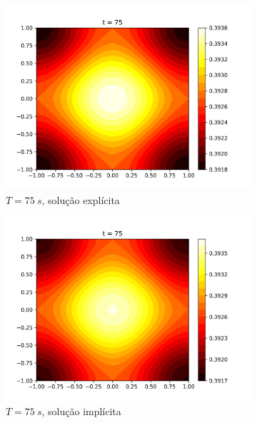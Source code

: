 \documentclass{article}
\begin{document}
\begin{figure}[h]
\begin{subfigure}[b]{0.49\textwidth}
         \includegraphics[width=\textwidth]{figs/q7a_heatmap_t75.png}
         \caption{$T=75~s$, solução explícita}
	\label{fig:q7a_heatmap_t75}
     \end{subfigure}
     \hfill
     \begin{subfigure}[b]{0.49\textwidth}
         \centering
     \includegraphics[width=\textwidth]{figs/q7b_heatmap_t75.png}
         \caption{$T=75~s$, solução implícita}
	\label{fig:q7b_heatmap_t75}
     \end{subfigure}
     \begin{subfigure}[b]{0.49\textwidth}
         \centering

\end{subfigure}
\end{figure}
\end{document}
